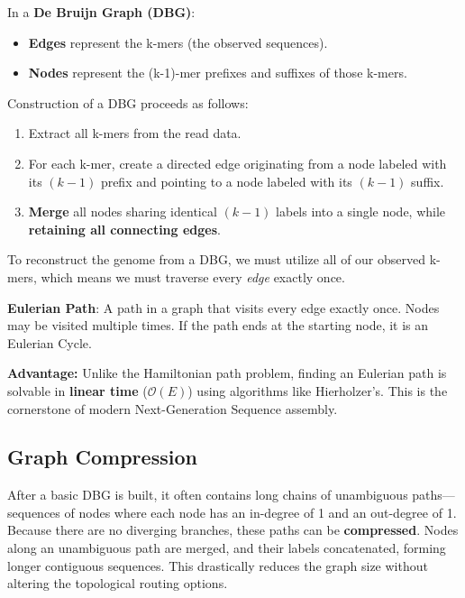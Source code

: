 In a \textbf{De Bruijn Graph (DBG)}:
\begin{itemize}
    \item \textbf{Edges} represent the k-mers (the observed sequences).
    \item \textbf{Nodes} represent the (k-1)-mer prefixes and suffixes of those k-mers.
\end{itemize}

Construction of a DBG proceeds as follows:
\begin{enumerate}
    \item Extract all k-mers from the read data.
    \item For each k-mer, create a directed edge originating from a node labeled with its $(k-1)$ prefix and pointing to a node labeled with its $(k-1)$ suffix.
    \item \textbf{Merge} all nodes sharing identical $(k-1)$ labels into a single node, while \textbf{retaining all connecting edges}.
\end{enumerate}

To reconstruct the genome from a DBG, we must utilize all of our observed k-mers, which means we must traverse every \textit{edge} exactly once.
\begin{important}
    \textbf{Eulerian Path}: A path in a graph that visits every edge exactly once. Nodes may be visited multiple times. If the path ends at the starting node, it is an Eulerian Cycle.
\end{important}

\sta \textbf{Advantage:} Unlike the Hamiltonian path problem, finding an Eulerian path is solvable in \textbf{linear time} ($\mathcal{O}(E)$) using algorithms like Hierholzer's. This is the cornerstone of modern Next-Generation Sequence assembly.

\subsection{Graph Compression}
After a basic DBG is built, it often contains long chains of unambiguous paths—sequences of nodes where each node has an in-degree of 1 and an out-degree of 1. Because there are no diverging branches, these paths can be \textbf{compressed}.
Nodes along an unambiguous path are merged, and their labels concatenated, forming longer contiguous sequences. This drastically reduces the graph size without altering the topological routing options.


